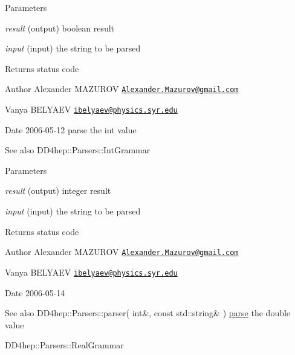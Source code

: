 \begin{DoxyParams}{Parameters}
\item[{\em result}](output) boolean result \item[{\em input}](input) the string to be parsed \end{DoxyParams}
\begin{DoxyReturn}{Returns}
status code
\end{DoxyReturn}
\begin{DoxyAuthor}{Author}
Alexander MAZUROV \href{mailto:Alexander.Mazurov@gmail.com}{\tt Alexander.Mazurov@gmail.com} 

Vanya BELYAEV \href{mailto:ibelyaev@physics.syr.edu}{\tt ibelyaev@physics.syr.edu} 
\end{DoxyAuthor}
\begin{DoxyDate}{Date}
2006-\/05-\/12 parse the {\ttfamily int} value 
\end{DoxyDate}
\begin{DoxySeeAlso}{See also}
DD4hep::Parsers::IntGrammar 
\end{DoxySeeAlso}

\begin{DoxyParams}{Parameters}
\item[{\em result}](output) integer result \item[{\em input}](input) the string to be parsed \end{DoxyParams}
\begin{DoxyReturn}{Returns}
status code
\end{DoxyReturn}
\begin{DoxyAuthor}{Author}
Alexander MAZUROV \href{mailto:Alexander.Mazurov@gmail.com}{\tt Alexander.Mazurov@gmail.com} 

Vanya BELYAEV \href{mailto:ibelyaev@physics.syr.edu}{\tt ibelyaev@physics.syr.edu} 
\end{DoxyAuthor}
\begin{DoxyDate}{Date}
2006-\/05-\/14 
\end{DoxyDate}
\begin{DoxySeeAlso}{See also}
DD4hep::Parsers::parser( int\&, const std::string\& ) \hyperlink{namespace_d_d4hep_1_1_parsers_a49cf20eb52b8e48550d6e3f74b94069e}{parse} the {\ttfamily double} value 

DD4hep::Parsers::RealGrammar 
\end{DoxySeeAlso}


